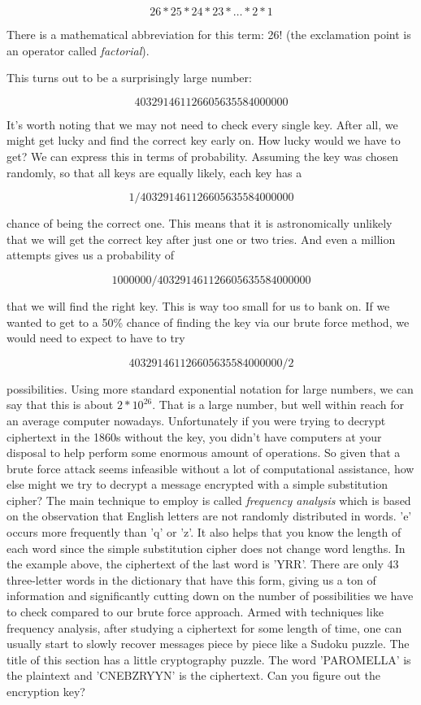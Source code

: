 \documentclass[UTF8]{book}
\begin{document}
\begin{CJK}{UTF8}{gbsn}
\[ 26*25*24*23* … * 2 * 1 \]

There is a mathematical abbreviation for this term: 26! (the exclamation point is an operator called \emph{factorial}).

This turns out to be a surprisingly large number:

\[ 403291461126605635584000000 \]

It's worth noting that we may not need to check every single key. After all, we might get lucky and find the correct key early on. How lucky would we have to get? We can express this in terms of probability. Assuming the key was chosen randomly, so that all keys are equally likely, each key has a

\[ 1/403291461126605635584000000 \]

chance of being the correct one. This means that it is astronomically unlikely that we will get the correct key after just one or two tries. And even a million attempts gives us a probability of

\[ 1000000/403291461126605635584000000 \]

that we will find the right key. This is way too small for us to bank on. If we wanted to get to a 50\% chance of finding the key via our brute force method, we would need to expect to have to try

\[ 403291461126605635584000000/2 \]

possibilities. Using more standard exponential notation for large numbers, we can say that this is about $2*10^{26}$. That is a large number, but well within reach for an average computer nowadays. Unfortunately if you were trying to decrypt ciphertext in the 1860s without the key, you didn't have computers at your disposal to help perform some enormous amount of operations. So given that a brute force attack seems infeasible without a lot of computational assistance, how else might we try to decrypt a message encrypted with a simple substitution cipher? The main technique to employ is called \emph{frequency analysis} which is based on the observation that English letters are not randomly distributed in words. 'e' occurs more frequently than 'q' or 'z'. It also helps that you know the length of each word since the simple substitution cipher does not change word lengths. In the example above, the ciphertext of the last word is 'YRR'. There are only 43 three-letter words in the dictionary that have this form, giving us a ton of information and significantly cutting down on the number of possibilities we have to check compared to our brute force approach. Armed with techniques like frequency analysis, after studying a ciphertext for some length of time, one can usually start to slowly recover messages piece by piece like a Sudoku puzzle. The title of this section has a little cryptography puzzle. The word 'PAROMELLA' is the plaintext and 'CNEBZRYYN' is the ciphertext. Can you figure out the encryption key?


\end{CJK}
\end{document}
